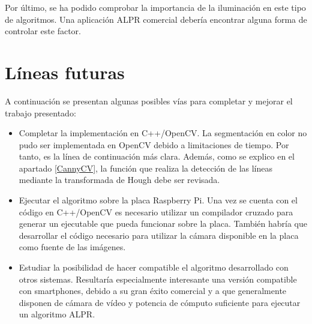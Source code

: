 Por último, se ha podido comprobar la importancia de la iluminación en este tipo de algoritmos. Una aplicación \ac{ALPR} comercial debería encontrar alguna forma de controlar este factor.

\section{Líneas futuras}
A continuación se presentan algunas posibles vías para completar y mejorar el trabajo presentado:

\begin{itemize}
\item Completar la implementación en C++/OpenCV. La segmentación en color no pudo ser implementada en OpenCV debido a limitaciones de tiempo. Por tanto, es la línea de continuación más clara. Además, como se explico en el apartado \ref{CannyCV}, la función que realiza la detección de las líneas mediante la transformada de Hough debe ser revisada.

\item Ejecutar el algoritmo sobre la placa Raspberry Pi. Una vez se cuenta con el código en C++/OpenCV es necesario utilizar un compilador cruzado para generar un ejecutable que pueda funcionar sobre la placa. También habría que desarrollar el código necesario para utilizar la cámara disponible en la placa como fuente de las imágenes.

\item Estudiar la posibilidad de hacer compatible el algoritmo desarrollado con otros sistemas. Resultaría especialmente interesante una versión compatible con smartphones, debido a su gran éxito comercial y a que generalmente disponen de cámara de vídeo y potencia de cómputo suficiente para ejecutar un algoritmo \ac{ALPR}.
\end{itemize}